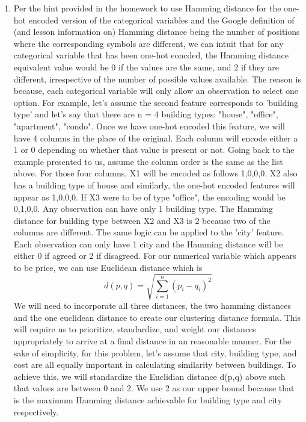 \documentclass{article}
\begin{document}
\begin{enumerate}
\item Per the hint provided in the homework to use Hamming distance for the one-hot encoded version of the categorical
variables and the Google definition of (and lesson information on) Hamming distance being the number
of positions where the corresponding symbols are different, we can intuit that for any categorical variable
that has been one-hot eoncded, the Hamming distance equivalent value would be 0 if the values are the same,
and 2 if they are different, irrespective of the number of possible values available. The reason is because,
each categorical variable will only allow an observation to select one option. For example, let's assume
the second feature corresponds to 'building type' and let's say that there are n = 4 building types: "house",
"office", "apartment", "condo". Once we have one-hot encoded this feature, we will have 4 columns in the place of
the original. Each column will encode either a 1 or 0 depending on whether that value is present or not.
Going back to the example presented to us, assume the column order is the same as the list above. For those
four columns, X1 will be encoded as follows 1,0,0,0. X2 also has a building type of house and similarly, the
one-hot encoded features will appear as 1,0,0,0. If X3 were to be of type "office", the encoding would
be 0,1,0,0. Any observation can have only 1 building type. The Hamming distance for building type between X2
and X3 is 2 because two of the columns are different. The same logic can be applied to the 'city' feature.
Each observation can only have 1 city and the Hamming distance will be either 0 if agreed or 2 if disagreed.
For our numerical variable which appears to be price, we can use Euclidean distance which is
\begin{equation}
d(p,q) = \sqrt{\sum_{i=1}^{n} \left( p_i - q_i \right)^2}
\end{equation}
We will need to incorporate all three distances, the two hamming distances and the one euclidean distance
to create our clustering distance formula. This will require us to prioritize, standardize, and weight
our distances appropriately to arrive at a final distance in an reasonable manner. For the sake of simplicity,
for this problem, let's assume that city, building type, and cost are all equally important in calculating
similarity between buildings. To achieve this, we will standardize the Euclidian distance d(p,q) above
such that values are between 0 and 2. We use 2 as our upper bound because that is the maximum Hamming distance
achievable for building type and city respectively.

\end{enumerate}
\end{document}

